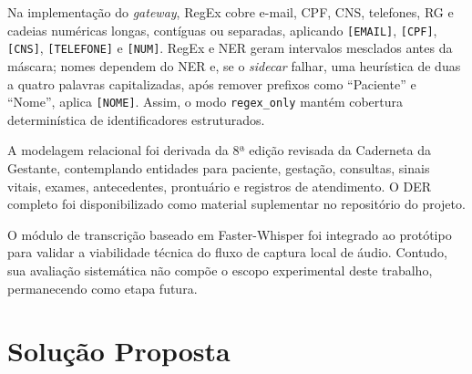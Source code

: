\documentclass[12pt]{article}
\begin{document}
Na implementação do \textit{gateway}, RegEx cobre e-mail, CPF, CNS, telefones, RG e cadeias numéricas longas, contíguas ou separadas, aplicando \texttt{[EMAIL]}, \texttt{[CPF]}, \texttt{[CNS]}, \texttt{[TELEFONE]} e \texttt{[NUM]}. RegEx e NER geram intervalos mesclados antes da máscara; nomes dependem do NER e, se o \textit{sidecar} falhar, uma heurística de duas a quatro palavras capitalizadas, após remover prefixos como ``Paciente'' e ``Nome'', aplica \texttt{[NOME]}. Assim, o modo \texttt{regex\_only} mantém cobertura determinística de identificadores estruturados.

A modelagem relacional foi derivada da 8ª edição revisada da Caderneta da Gestante, contemplando entidades para paciente, gestação, consultas, sinais vitais, exames, antecedentes, prontuário e registros de atendimento.
O DER completo foi disponibilizado como material suplementar no repositório do projeto.

O módulo de transcrição baseado em Faster-Whisper foi integrado ao protótipo para validar a viabilidade técnica do fluxo de captura local de áudio. Contudo, sua avaliação sistemática não compõe o escopo experimental deste trabalho, permanecendo como etapa futura.



\section{Solução Proposta}
\end{document}
